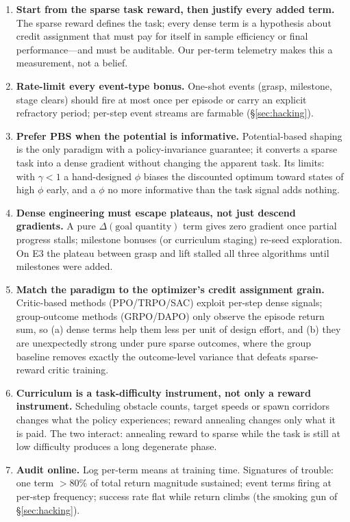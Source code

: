 \documentclass[journal,twoside]{IEEEtran}
\begin{document}
\begin{enumerate}
\item \textbf{Start from the sparse task reward, then justify every added
term.} The sparse reward defines the task; every dense term is a hypothesis
about credit assignment that must pay for itself in sample efficiency or
final performance---and must be auditable. Our per-term telemetry makes
this a measurement, not a belief.
\item \textbf{Rate-limit every event-type bonus.} One-shot events
(grasp, milestone, stage clears) should fire at most once per episode or
carry an explicit refractory period; per-step event streams are farmable
(\S\ref{sec:hacking}).
\item \textbf{Prefer PBS when the potential is informative.} Potential-based
shaping is the only paradigm with a policy-invariance guarantee; it
converts a sparse task into a dense gradient without changing the apparent
task. Its limits: with $\gamma<1$ a hand-designed $\phi$ biases the
discounted optimum toward states of high $\phi$ early, and a $\phi$ no more
informative than the task signal adds nothing.
\item \textbf{Dense engineering must escape plateaus, not just descend
gradients.} A pure $\Delta(\text{goal quantity})$ term gives zero gradient
once partial progress stalls; milestone bonuses (or curriculum staging)
re-seed exploration. On E3 the plateau between grasp and lift stalled all
three algorithms until milestones were added.
\item \textbf{Match the paradigm to the optimizer's credit assignment
grain.} Critic-based methods (PPO/TRPO/SAC) exploit per-step dense signals;
group-outcome methods (GRPO/DAPO) only observe the episode return sum, so
(a) dense terms help them less per unit of design effort, and (b) they are
unexpectedly strong under pure sparse outcomes, where the group baseline
removes exactly the outcome-level variance that defeats sparse-reward
critic training.
\item \textbf{Curriculum is a task-difficulty instrument, not only a reward
instrument.} Scheduling obstacle counts, target speeds or spawn corridors
changes what the policy experiences; reward annealing changes only what it
is paid. The two interact: annealing reward to sparse while the task is
still at low difficulty produces a long degenerate phase.
\item \textbf{Audit online.} Log per-term means at training time. Signatures
of trouble: one term $>$80\% of total return magnitude sustained; event
terms firing at per-step frequency; success rate flat while return climbs
(the smoking gun of \S\ref{sec:hacking}).
\end{enumerate}
\end{document}
